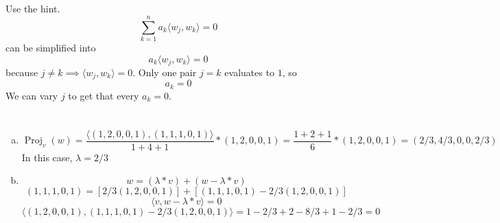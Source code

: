 \documentclass[12pt]{article}
\begin{document}
\section{}
Use the hint. \[ \sum_{k=1}^{n} a_k \langle w_j, w_k \rangle = 0\] can be simplified into \[a_k \langle w_j, w_k \rangle = 0\] because $ j \neq k \implies \langle w_j, w_k \rangle = 0 $. Only one pair $ j = k $ evaluates to $ 1 $, so \[a_k = 0\] We can vary $ j $ to get that every $ a_k = 0 $.
\newpage

\section{}
\begin{enumerate}[(a)]
	\item \[ \operatorname{Proj}_v(w) = \dfrac{\langle (1,2,0,0,1), (1,1,1,0,1) \rangle }{1+4+1} * (1,2,0,0,1) = \dfrac{1+2+1}{6} * (1,2,0,0,1) = (2/3, 4/3, 0, 0, 2/3) \] In this case, $ \lambda = 2/3 $
	
	\item \[ w = (\lambda * v) + (w-\lambda * v) \]
	\[(1,1,1,0,1) = [2/3 (1,2,0,0,1)] + [(1,1,1,0,1)-2/3(1,2,0,0,1)]\]
	\[\langle v, w - \lambda * v\rangle = 0\]
	\[\langle (1,2,0,0,1), (1,1,1,0,1)-2/3(1,2,0,0,1)\rangle = 1 - 2/3 + 2- 8/3 + 1 - 2/3 = 0\]
\end{enumerate}
\newpage
\end{document}
